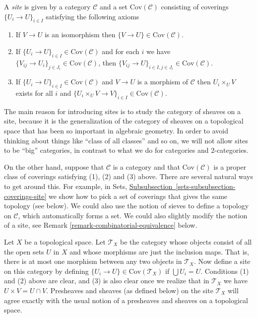 \begin{definition}
\label{definition-site}
A {\it site} is given by a category $\mathcal{C}$ and a set 
$\text{Cov}(\mathcal{C})$ consisting of coverings 
$\{U_i \to U\}_{i \in I}$ satisfying the following axioms
\begin{enumerate}
\item If $V \to U$ is an isomorphism then $\{V \to U\} \in 
\text{Cov}(\mathcal{C})$.
\item If $\{U_i \to U\}_{i\in I} \in \text{Cov}(\mathcal{C})$ and for each
$i$ we have $\{V_{ij} \to U_i\}_{j\in J_i} \in \text{Cov}(\mathcal{C})$, then
$\{V_{ij} \to U\}_{i \in I, j\in J_i} \in \text{Cov}(\mathcal{C})$.
\item If $\{U_i \to U\}_{i\in I}\in \text{Cov}(\mathcal{C})$
and $V \to U$ is a morphism of $\mathcal{C}$ then $U_i \times_U V$
exists for all $i$ and
$\{U_i \times_U V \to V \}_{i\in I} \in \text{Cov}(\mathcal{C})$.
\end{enumerate}
\end{definition}

\begin{remark}
\label{remark-no-big-sites}
The main reason for introducing sites is to study the
category of sheaves on a site, because it is the generalization
of the category of sheaves on a topological space that has
been so important in algebraic geometry. In order to avoid thinking
about things like ``class of all classes'' and so on, we will
not allow sites to be ``big'' categories, in contrast to what
we do for categories and $2$-categories.

\medskip\noindent
On the other hand, suppose that $\mathcal{C}$ is a category and
that $\text{Cov}(\mathcal{C})$ is a proper class of coverings
satisfying (1), (2) and (3) above. There are several natural
ways to get around this. For example, in Sets,
\hyperref[sets-subsubsection-coverings-site]%
{Subsubsection~\ref*{sets-subsubsection-coverings-site}} we show how
to pick a set of coverings that gives the same topology (see below).
We could also use the notion of sieves to define a topology on $\mathcal{C}$,
which automatically forms a set. We could also slightly modify the
notion of a site, see Remark \ref{remark-combinatorial-equivalence}
below.
\end{remark}

\begin{example}
\label{example-site-toplogical}
Let $X$ be a topological space. Let $\mathcal{T}_X$ be the category whose
objects consist of all the open sets $U$ in $X$ and whose morphisms
are just the inclusion maps. That is, there is at most one morphism
between any two objects in $\mathcal{T}_X$.  Now define a site on this
category by defining $\{U_i \to U\}\in \text{Cov}(\mathcal{T}_X)$ if
$\bigcup U_i = U$. Conditions (1) and (2) above are clear, and (3) is also
clear once we realize that in $\mathcal{T}_X$ we have
$U \times V = U \cap V$. Presheaves and sheaves (as defined below)
on the site $\mathcal{T}_X$ will agree exactly with the usual notion of
a presheaves and sheaves on a topological space.
\end{example}

